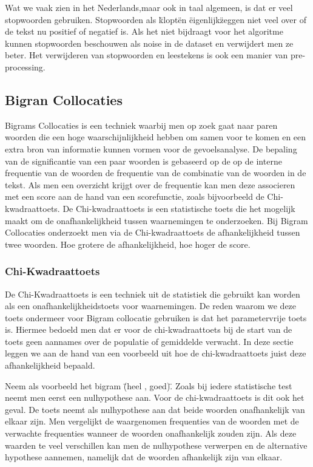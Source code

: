 Wat we vaak zien in het Nederlands,maar ook in taal algemeen,  is dat er veel stopwoorden gebruiken. Stopwoorden als \"klopt\" en \"eigenlijk\" zeggen niet veel over of de tekst nu positief of negatief is. Als het niet bijdraagt voor het algoritme kunnen stopwoorden beschouwen als noise in de dataset en verwijdert men ze beter. Het verwijderen van stopwoorden en leestekens is ook een manier van pre-processing.

\subsection{Bigran Collocaties}\label{Bigram Collocaties}

Bigrams Collocaties is een techniek waarbij men op zoek gaat naar  paren woorden die een hoge waarschijnlijkheid hebben om samen voor te komen en een extra bron van informatie kunnen vormen voor de gevoelsanalyse. De bepaling van de significantie van een paar woorden is gebaseerd op de op de interne frequentie van de woorden de frequentie van de combinatie van de woorden in de tekst. Als men een overzicht krijgt over de frequentie kan men deze associeren met een  score aan de hand van een scorefunctie, zoals bijvoorbeeld de Chi-kwadraattoets. De Chi-kwadraattoets is een statistische toets die het mogelijk maakt om de onafhankelijkheid tussen waarnemingen te onderzoeken. Bij Bigram Collocaties onderzoekt men via de Chi-kwadraattoets de afhankelijkheid tussen twee woorden. Hoe grotere de afhankelijkheid, hoe hoger de score.   

\subsubsection{Chi-Kwadraattoets}\label{Chi-Kwadraattoest}

De Chi-Kwadraattoets is een techniek uit de statistiek die gebruikt  kan worden als een onafhankelijkheidstoets voor waarnemingen. De reden waarom we deze toets ondermeer voor Bigram collocatie gebruiken is dat het parametervrije toets is. Hiermee bedoeld men dat er voor de chi-kwadraattoets bij de start van de toets geen aannames over de populatie of gemiddelde verwacht. In deze sectie leggen we aan de hand van een voorbeeld uit hoe de chi-kwadraattoets juist deze afhankelijkheid bepaald.

 Neem als voorbeeld het bigram \"(heel , goed)\". Zoals bij iedere statistische test neemt men eerst een nulhypothese aan. Voor de chi-kwadraattoets is dit ook het geval. De toets neemt als nulhypothese aan dat beide woorden onafhankelijk van elkaar zijn. Men vergelijkt de waargenomen frequenties van de woorden met de verwachte frequenties wanneer de woorden onafhankelijk zouden zijn. Als deze waarden te veel verschillen kan men de nulhypothese verwerpen en de alternative hypothese aannemen, namelijk dat de woorden afhankelijk zijn van elkaar. 

